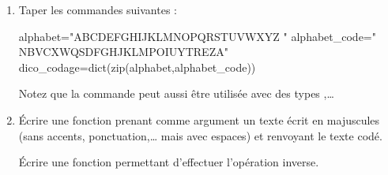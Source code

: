 \documentclass[11pt,a4paper,french,twoside]{PMCours}
\begin{document}
\begin{enumerate}
\item Taper les commandes suivantes :
\begin{Python}
alphabet="ABCDEFGHIJKLMNOPQRSTUVWXYZ "
alphabet_code=" NBVCXWQSDFGHJKLMPOIUYTREZA"
dico_codage=dict(zip(alphabet,alphabet_code))
\end{Python}
Notez que la commande  peut aussi être utilisée 
avec des types ,\dots
\item Écrire une fonction  prenant comme argument 
un texte écrit en majuscules (sans accents, ponctuation,\dots{} mais avec espaces) 
et renvoyant le texte codé.

Écrire une fonction  permettant d'effectuer 
l'opération inverse.
\end{enumerate}
\end{document}

